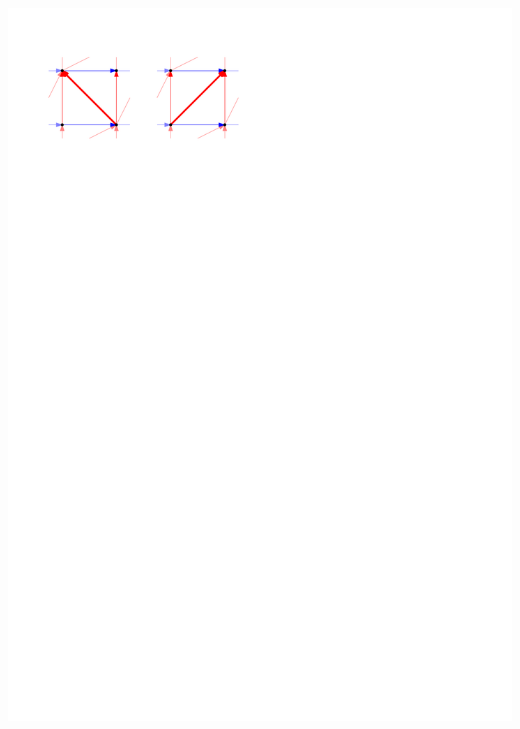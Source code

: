 \documentclass[a4paper]{article}
\begin{document}
\includegraphics[scale=1]{./unifiedAlgo/img/zflip/flip.pdf}
\clearpage%
\end{document}

